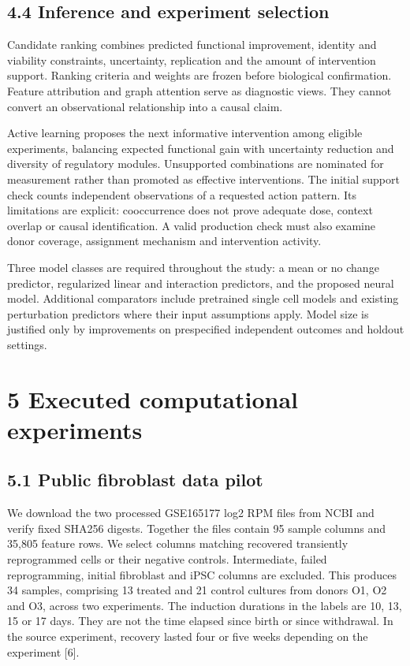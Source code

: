\documentclass[
  11pt,
  letterpaper,
]{article}
\begin{document}
\hypertarget{inference-and-experiment-selection}{%
\subsection{4.4 Inference and experiment
selection}\label{inference-and-experiment-selection}}

Candidate ranking combines predicted functional improvement, identity
and viability constraints, uncertainty, replication and the amount of
intervention support. Ranking criteria and weights are frozen before
biological confirmation. Feature attribution and graph attention serve
as diagnostic views. They cannot convert an observational relationship
into a causal claim.

Active learning proposes the next informative intervention among
eligible experiments, balancing expected functional gain with
uncertainty reduction and diversity of regulatory modules. Unsupported
combinations are nominated for measurement rather than promoted as
effective interventions. The initial support check counts independent
observations of a requested action pattern. Its limitations are
explicit: cooccurrence does not prove adequate dose, context overlap or
causal identification. A valid production check must also examine donor
coverage, assignment mechanism and intervention activity.

Three model classes are required throughout the study: a mean or no
change predictor, regularized linear and interaction predictors, and the
proposed neural model. Additional comparators include pretrained single
cell models and existing perturbation predictors where their input
assumptions apply. Model size is justified only by improvements on
prespecified independent outcomes and holdout settings.

\hypertarget{executed-computational-experiments}{%
\section{5 Executed computational
experiments}\label{executed-computational-experiments}}

\hypertarget{public-fibroblast-data-pilot}{%
\subsection{5.1 Public fibroblast data
pilot}\label{public-fibroblast-data-pilot}}

We download the two processed GSE165177 log2 RPM files from NCBI and
verify fixed SHA256 digests. Together the files contain 95 sample
columns and 35,805 feature rows. We select columns matching recovered
transiently reprogrammed cells or their negative controls. Intermediate,
failed reprogramming, initial fibroblast and iPSC columns are excluded.
This produces 34 samples, comprising 13 treated and 21 control cultures
from donors O1, O2 and O3, across two experiments. The induction
durations in the labels are 10, 13, 15 or 17 days. They are not the time
elapsed since birth or since withdrawal. In the source experiment,
recovery lasted four or five weeks depending on the experiment {[}6{]}.
\end{document}
